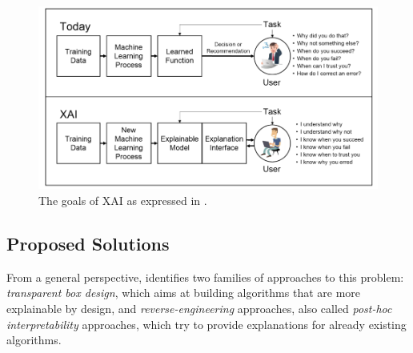 \documentclass[conference]{IEEEtran}
\begin{document}
\begin{figure}[h!] \includegraphics[width=\linewidth]{images/xai.png}
    \caption{The goals of XAI as expressed in \citet{DARPA}. } \label{fig:xai}
\end{figure}

\subsection{Proposed Solutions}
\label{sec:solutions}




From a general perspective, \citet{Giannotti} identifies two families of
approaches to this problem: \textit{transparent box design}, which aims at
building algorithms that are more explainable by design, and
\textit{reverse-engineering} approaches, also called \textit{post-hoc
    interpretability} approaches, which try to provide explanations for already
existing algorithms.
\end{document}
